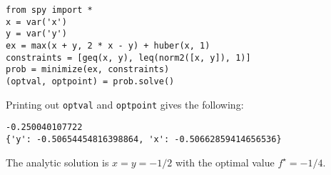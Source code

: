\begin{verbatim}
from spy import *
x = var('x')
y = var('y')
ex = max(x + y, 2 * x - y) + huber(x, 1)
constraints = [geq(x, y), leq(norm2([x, y]), 1)]
prob = minimize(ex, constraints)
(optval, optpoint) = prob.solve()
\end{verbatim}
Printing out \verb'optval' and \verb'optpoint' gives the following:
\begin{verbatim}
-0.250040107722
{'y': -0.50654454816398864, 'x': -0.50662859414656536}
\end{verbatim}
The analytic solution is $x=y=-1/2$ with the optimal value $f^\star = -1/4$.
